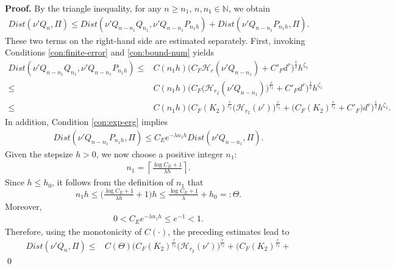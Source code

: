 \documentclass[12pt]{article}
\numberwithin{equation}{section}
\renewenvironment{proof}%
  {\begin{trivlist}%
   \item[]\ignorespaces}%
  {\qed\end{trivlist}}
\begin{document}
\begin{proof}
\textbf{Proof.}
By the triangle inequality, for any $n\geq n_1$, $n, n_1\in\mathbb{N}$, we obtain
\begin{align}
\textit{Dist}
(\nu' Q_n,\Pi) 
\leq 
\textit{Dist}
(\nu' Q_{n-n_1}Q_{n_1},
\nu' Q_{n-n_1}P_{n_1h})
+
\textit{Dist}
(\nu' Q_{n-n_1}P_{n_1h},
\Pi).
\end{align}
These two terms on the right-hand side are estimated separately.
First, invoking Conditions \ref{con:finite-error} and \ref{con:bound-num} yields
\begin{align}
\textit{Dist} 
(\nu' Q_{n-n_1} Q_{n_1}, 
\nu' Q_{n-n_1}P_{n_1h})
\leq
& 
C(n_1 h)
\big(
C_F
\mathcal{H}_r(\nu' Q_{n-n_1})
+
C'_{F}
d^{r}
\big)^{\frac{1}{2}}
h^{\zeta_1} 
\nonumber
\\
\leq
& 
C(n_1 h)
\Big(
C_F
\big(
\mathcal{H}_{r_2}(\nu' Q_{n-n_1})
\big)^{\frac{r}{r_2}}
+
C'_{F}
d^{r}
\Big)^{\frac{1}{2}}
h^{\zeta_1} 
\nonumber
\\
\leq
&
C(n_1h)
\Big(
C_F
(K_2) ^{\frac{r}{r_2}}
\big(\mathcal{H}_{r_2}(\nu')\big)^{\frac{r}{r_2}}
+
\big(C_F (K_2)^{\frac{r}{r_2}}
+
C'_{F}\big)d^{r}
\Big)^{\frac{1}{2}}
h^{\zeta_1}.
\end{align}
In addition, Condition \ref{con:exp-erg} implies
\begin{align}
\textit{Dist}
(\nu'Q_{n-n_1}P_{n_1h},
\Pi) 
\leq 
C_E
e^{-\lambda n_1h}
\textit{Dist}
(\nu' Q_{n-n_1},
\Pi).
\end{align}
Given the stepsize $h>0$, we now choose a positive integer $n_1$:
\begin{align}
\label{eq:framework-n_1}
    n_1 = \left\lceil \tfrac{\log C_E + 1}{\lambda h} \right\rceil.
\end{align}
%
%
Since $h\leq h_0$, it follows from the definition of $n_1$ that
\begin{equation}
n_1  h 
\le
\big(
\tfrac{\log C_E + 1}{\lambda h}
+
1
\big)
h 
\le
\tfrac{\log C_E + 1}{\lambda}
+
h_0
=:
\Theta.
\end{equation}
Moreover, 
\begin{align}
    0 < C_E e^{-\lambda n_1 h} \leq e^{-1} < 1.
\end{align}
Therefore, using the monotonicity of $C(\cdot)$, the preceding estimates lead to
\begin{align}
    \textit{Dist}(\nu' Q_n,\Pi)
    \leq & 
    C(\Theta)
    \Big(
    C_F
    (K_2) ^{\frac{r}{r_2}}
    \big(\mathcal{H}_{r_2}(\nu')\big)^{\frac{r}{r_2}}
    +
    \big(C_F (K_2)^{\frac{r}{r_2}}
    +

\end{align}
\end{proof}
\end{document}
